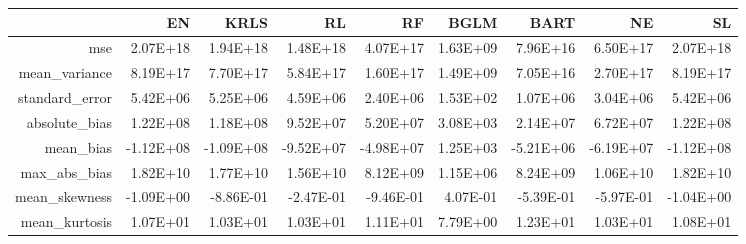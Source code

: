 \begin{table}[ht]
\centering
\begin{tabular}{rrrrrrrrr}
  \hline
 & EN & KRLS & RL & RF & BGLM & BART & NE & SL \\ 
  \hline
mse & 2.07E+18 & 1.94E+18 & 1.48E+18 & 4.07E+17 & 1.63E+09 & 7.96E+16 & 6.50E+17 & 2.07E+18 \\ 
  mean\_variance & 8.19E+17 & 7.70E+17 & 5.84E+17 & 1.60E+17 & 1.49E+09 & 7.05E+16 & 2.70E+17 & 8.19E+17 \\ 
  standard\_error & 5.42E+06 & 5.25E+06 & 4.59E+06 & 2.40E+06 & 1.53E+02 & 1.07E+06 & 3.04E+06 & 5.42E+06 \\ 
  absolute\_bias & 1.22E+08 & 1.18E+08 & 9.52E+07 & 5.20E+07 & 3.08E+03 & 2.14E+07 & 6.72E+07 & 1.22E+08 \\ 
  mean\_bias & -1.12E+08 & -1.09E+08 & -9.52E+07 & -4.98E+07 & 1.25E+03 & -5.21E+06 & -6.19E+07 & -1.12E+08 \\ 
  max\_abs\_bias & 1.82E+10 & 1.77E+10 & 1.56E+10 & 8.12E+09 & 1.15E+06 & 8.24E+09 & 1.06E+10 & 1.82E+10 \\ 
  mean\_skewness & -1.09E+00 & -8.86E-01 & -2.47E-01 & -9.46E-01 & 4.07E-01 & -5.39E-01 & -5.97E-01 & -1.04E+00 \\ 
  mean\_kurtosis & 1.07E+01 & 1.03E+01 & 1.03E+01 & 1.11E+01 & 7.79E+00 & 1.23E+01 & 1.03E+01 & 1.08E+01 \\ 
   \hline
\end{tabular}
\end{table}
